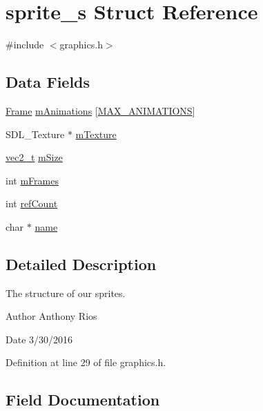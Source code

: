 \hypertarget{structsprite__s}{}\section{sprite\+\_\+s Struct Reference}
\label{structsprite__s}


{\ttfamily \#include $<$graphics.\+h$>$}

\subsection*{Data Fields}
\begin{DoxyCompactItemize}
\item 
\hyperlink{struct_frame}{Frame} \hyperlink{structsprite__s_a8ce6c2916d6244600c434144ed6ac296}{m\+Animations} \mbox{[}\hyperlink{graphics_8h_a99f9cfd68ef4237b568bda6e3e63312f}{M\+A\+X\+\_\+\+A\+N\+I\+M\+A\+T\+I\+O\+NS}\mbox{]}
\item 
S\+D\+L\+\_\+\+Texture $\ast$ \hyperlink{structsprite__s_a13441ecc6f09930e330ecc4b48189778}{m\+Texture}
\item 
\hyperlink{globals_8h_a773f2054819bb6014f1e50baa39cb5e3}{vec2\+\_\+t} \hyperlink{structsprite__s_a94c822928b0483a24e1f4a176f161954}{m\+Size}
\item 
int \hyperlink{structsprite__s_acd9c3d76b8dfc0aed0c331ec5f0568f1}{m\+Frames}
\item 
int \hyperlink{structsprite__s_a43ab0d8eafd71383b2233bdee65911de}{ref\+Count}
\item 
char $\ast$ \hyperlink{structsprite__s_a5ac083a645d964373f022d03df4849c8}{name}
\end{DoxyCompactItemize}


\subsection{Detailed Description}
The structure of our sprites.

\begin{DoxyAuthor}{Author}
Anthony Rios 
\end{DoxyAuthor}
\begin{DoxyDate}{Date}
3/30/2016 
\end{DoxyDate}


Definition at line 29 of file graphics.\+h.



\subsection{Field Documentation}

